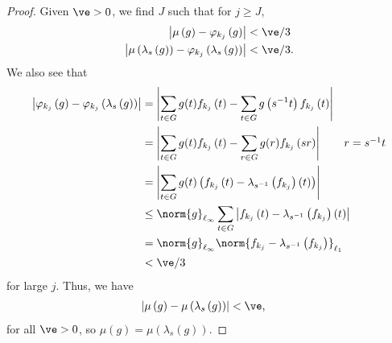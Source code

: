 \begin{proof}
  Given $\ve > 0$, we find $J$ such that for $j\geq J$,
  \begin{align*}
    \left\vert \mu\left(g\right) - \varphi_{k_j}\left(g\right) \right\vert &< \ve/3\\
    \left\vert \mu\left(\lambda_s\left(g\right)\right) - \varphi_{k_j}\left(\lambda_s\left(g\right)\right)\right\vert &< \ve/3.
  \end{align*}
  We also see that
  \begin{align*}
    \left\vert \varphi_{k_j}\left(g\right) - \varphi_{k_j}\left(\lambda_s\left(g\right)\right) \right\vert &= \left\vert \sum_{t\in G}g(t)f_{k_j}\left(t\right) - \sum_{t\in G}g\left(s^{-1}t\right)f_{k_j}\left(t\right) \right\vert\\
                                                                                                           &= \left\vert \sum_{t\in G}g(t)f_{k_j}\left(t\right) - \sum_{r\in G}g(r)f_{k_j}\left(sr\right) \right\vert \tag*{$r = s^{-1}t$}\\
                                                                                                           &= \left\vert \sum_{t\in G}g(t)\left(f_{k_j}\left(t\right)-\lambda_{s^{-1}}\left(f_{k_j}\right)\left(t\right)\right) \right\vert\\
                                                                                                           &\leq \norm{g}_{\ell_\infty}\sum_{t\in G}\left\vert f_{k_j}\left(t\right) - \lambda_{s^{-1}}\left(f_{k_j}\right)\left(t\right) \right\vert\\
                                                                                                           &= \norm{g}_{\ell_\infty}\norm{f_{k_j} - \lambda_{s^{-1}}\left(f_{k_j}\right)}_{\ell_1}\\
                                                                                                           &< \ve/3
  \end{align*}
  for large $j$. Thus, we have
  \begin{align*}
    \left\vert \mu\left(g\right) - \mu\left(\lambda_{s}\left(g\right)\right) \right\vert &< \ve,
  \end{align*}
  for all $\ve > 0$, so $\mu\left(g\right) = \mu\left(\lambda_{s}\left(g\right)\right)$.
\end{proof}

